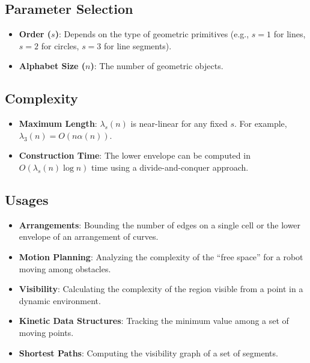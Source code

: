 \subsection{Parameter Selection}
\begin{itemize}
    \item \textbf{Order ($s$)}: Depends on the type of geometric primitives (e.g., $s=1$ for lines, $s=2$ for circles, $s=3$ for line segments).
    \item \textbf{Alphabet Size ($n$)}: The number of geometric objects.
\end{itemize}

\subsection{Complexity}
\begin{itemize}
    \item \textbf{Maximum Length}: $\lambda_s(n)$ is near-linear for any fixed $s$. For example, $\lambda_3(n) = O(n \alpha(n))$.
    \item \textbf{Construction Time}: The lower envelope can be computed in $O(\lambda_s(n) \log n)$ time using a divide-and-conquer approach.
\end{itemize}

\subsection{Usages}
\begin{itemize}
    \item \textbf{Arrangements}: Bounding the number of edges on a single cell or the lower envelope of an arrangement of curves.
    \item \textbf{Motion Planning}: Analyzing the complexity of the ``free space'' for a robot moving among obstacles.
    \item \textbf{Visibility}: Calculating the complexity of the region visible from a point in a dynamic environment.
    \item \textbf{Kinetic Data Structures}: Tracking the minimum value among a set of moving points.
    \item \textbf{Shortest Paths}: Computing the visibility graph of a set of segments.
\end{itemize}


